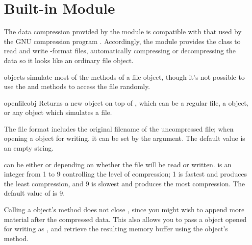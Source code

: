 \section{Built-in Module }
\label{module-gzip}

The data compression provided by the  module is compatible
with that used by the GNU compression program .
Accordingly, the  module provides the  class
to read and write -format files, automatically compressing
or decompressing the data so it looks like an ordinary file object.

 objects simulate most of the methods of a file
object, though it's not possible to use the  and
 methods to access the file randomly.

\begin{funcdesc}{open}{fileobj}
  Returns a new  object on top of , which
  can be a regular file, a  object, or any object which
  simulates a file.

  The  file format includes the original filename of the
  uncompressed file; when opening a  object for
  writing, it can be set by the  argument.  The default
  value is an empty string.

   can be either  or  depending on
  whether the file will be read or written.   is an
  integer from 1 to 9 controlling the level of compression; 1 is
  fastest and produces the least compression, and 9 is slowest and
  produces the most compression.  The default value of
   is 9.

  Calling a  object's  method does not
  close , since you might wish to append more material
  after the compressed data.  This also allows you to pass a
   object opened for writing as , and
  retrieve the resulting memory buffer using the 
  object's  method.
\end{funcdesc}

\begin{seealso}
\end{seealso}

